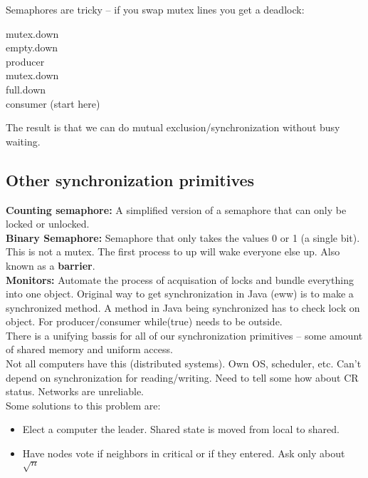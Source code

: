\documentclass[../base_file/cs1550_notes.tex]{subfiles}
\begin{document}
Semaphores are tricky -- if you swap mutex lines you get a deadlock:
\begin{center}
\begin{multicols}{2}
mutex.down\\
empty.down\\
producer\\
\columnbreak
mutex.down\\
full.down\\
consumer (start here)\\
\end{multicols}
\end{center}
The result is that we can do mutual exclusion/synchronization without busy waiting.

\subsection{Other synchronization primitives}
\textbf{Counting semaphore:} A simplified version of a semaphore that can only be locked or unlocked.\\
\textbf{Binary Semaphore:} Semaphore that only takes the values 0 or 1 (a single bit).  This is not a
mutex.  The first process to up will wake everyone else up. Also known as a \textbf{barrier}.\\
\textbf{Monitors:} Automate the process of acquisation of locks and bundle everything into one object.
Original way to get synchronization in Java (eww) is to make a synchronized method.  A method in Java
being synchronized has to check lock on object.  For producer/consumer while(true) needs to be outside.\\

There is a unifying bassis for all of our synchronization primitives -- some amount of shared memory and
uniform access.\\

Not all computers have this (distributed systems).  Own OS, scheduler, etc.  Can't depend on synchronization
for reading/writing.  Need to tell some how about CR status.  Networks are unreliable.\\

Some solutions to this problem are:
\begin{itemize}
	\item Elect a computer the leader.  Shared state is moved from local to shared.
	\item Have nodes vote if neighbors in critical or if they entered.  Ask only about $\sqrt{n}$
\end{itemize}
\end{document}
